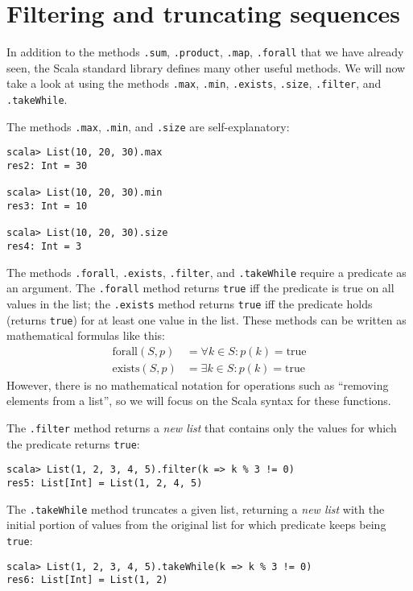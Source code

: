 \section{Filtering and truncating sequences}

In addition to the methods \lstinline!.sum!, \lstinline!.product!,
\lstinline!.map!, \texttt{}\lstinline!.forall! that we have already
seen, the Scala standard library defines many other useful methods.
We will now take a look at using the methods \lstinline!.max!, \lstinline!.min!,
\lstinline!.exists!, \lstinline!.size!, \lstinline!.filter!, and
\lstinline!.takeWhile!. 

The methods \lstinline!.max!, \lstinline!.min!, and \texttt{}\lstinline!.size!
are self-explanatory:
\begin{lstlisting}
scala> List(10, 20, 30).max
res2: Int = 30

scala> List(10, 20, 30).min
res3: Int = 10

scala> List(10, 20, 30).size
res4: Int = 3
\end{lstlisting}

The methods \lstinline!.forall!, \lstinline!.exists!, \lstinline!.filter!,
and \texttt{}\lstinline!.takeWhile! require a predicate as an argument.
The \texttt{}\lstinline!.forall! method returns \texttt{}\lstinline!true!
iff the predicate is true on all values in the list; the \texttt{}\lstinline!.exists!
method returns \texttt{}\lstinline!true! iff the predicate holds
(returns \lstinline!true!) for at least one value in the list. These
methods can be written as mathematical formulas like this:
\begin{align*}
\text{forall}\left(S,p\right) & =\forall k\in S:p(k)=\text{true}\\
\text{exists}\left(S,p\right) & =\exists k\in S:p(k)=\text{true}
\end{align*}
However, there is no mathematical notation for operations such as
``removing elements from a list'', so we will focus on the Scala
syntax for these functions.

The \lstinline!.filter! method returns a \emph{new list} that contains
only the values for which the predicate returns \texttt{}\lstinline!true!:

\begin{lstlisting}
scala> List(1, 2, 3, 4, 5).filter(k => k % 3 != 0)
res5: List[Int] = List(1, 2, 4, 5)
\end{lstlisting}

The \texttt{}\lstinline!.takeWhile! method truncates a given list,
returning a \emph{new list} with the initial portion of values from
the original list for which predicate keeps being \lstinline!true!:
\begin{lstlisting}
scala> List(1, 2, 3, 4, 5).takeWhile(k => k % 3 != 0)
res6: List[Int] = List(1, 2)
\end{lstlisting}

